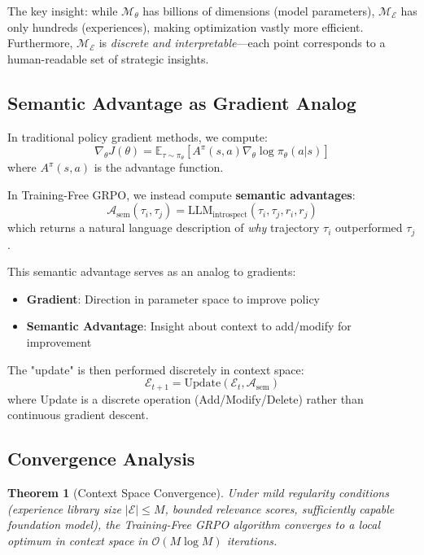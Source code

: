 \documentclass[11pt,a4paper]{article}
\newtheorem{theorem}{Theorem}
\begin{document}
The key insight: while $\mathcal{M}_\theta$ has billions of dimensions (model parameters), $\mathcal{M}_\mathcal{E}$ has only hundreds (experiences), making optimization vastly more efficient. Furthermore, $\mathcal{M}_\mathcal{E}$ is \textit{discrete and interpretable}—each point corresponds to a human-readable set of strategic insights.

\subsection{Semantic Advantage as Gradient Analog}

In traditional policy gradient methods, we compute:
\begin{equation}
\nabla_\theta J(\theta) = \mathbb{E}_{\tau \sim \pi_\theta}[A^\pi(s, a) \nabla_\theta \log \pi_\theta(a | s)]
\end{equation}
where $A^\pi(s, a)$ is the advantage function.

In Training-Free GRPO, we instead compute \textbf{semantic advantages}:
\begin{equation}
\mathcal{A}_{\text{sem}}(\tau_i, \tau_j) = \text{LLM}_{\text{introspect}}(\tau_i, \tau_j, r_i, r_j)
\end{equation}
which returns a natural language description of \textit{why} trajectory $\tau_i$ outperformed $\tau_j$.

This semantic advantage serves as an analog to gradients:
\begin{itemize}
    \item \textbf{Gradient}: Direction in parameter space to improve policy
    \item \textbf{Semantic Advantage}: Insight about context to add/modify for improvement
\end{itemize}

The "update" is then performed discretely in context space:
\begin{equation}
\mathcal{E}_{t+1} = \text{Update}(\mathcal{E}_t, \mathcal{A}_{\text{sem}})
\end{equation}
where Update is a discrete operation (Add/Modify/Delete) rather than continuous gradient descent.

\subsection{Convergence Analysis}

\begin{theorem}[Context Space Convergence]
Under mild regularity conditions (experience library size $|\mathcal{E}| \leq M$, bounded relevance scores, sufficiently capable foundation model), the Training-Free GRPO algorithm converges to a local optimum in context space in $\mathcal{O}(M \log M)$ iterations.
\end{theorem}
\end{document}
